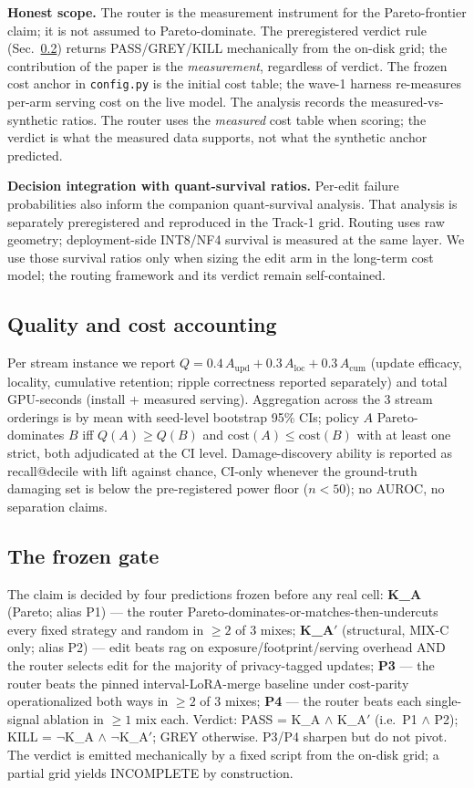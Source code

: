 \documentclass[preprint,12pt]{elsarticle}
\begin{document}
\textbf{Honest scope.} The router is the measurement instrument for the
Pareto-frontier claim; it is not assumed to Pareto-dominate.
The preregistered verdict rule (Sec.~\ref{sec:gate}) returns PASS/GREY/KILL
mechanically from the on-disk grid; the contribution of the paper is the
\emph{measurement}, regardless of verdict. The frozen cost anchor in
\texttt{config.py} is the initial cost table; the wave-1 harness re-measures
per-arm serving cost on the live model. The analysis records the
measured-vs-synthetic ratios.
The router uses the \emph{measured} cost table when scoring; the verdict is
what the measured data supports, not what the synthetic anchor predicted.

\textbf{Decision integration with quant-survival ratios.} Per-edit failure
probabilities also inform the companion quant-survival analysis. That analysis is
separately preregistered and reproduced in the Track-1 grid. Routing uses raw
geometry; deployment-side INT8/NF4 survival is measured at the same layer. We use
those survival ratios only when sizing the edit arm in the long-term cost model;
the routing framework and its verdict remain self-contained.

\subsection{Quality and cost accounting}
\label{sec:metrics}
Per stream instance we report $Q = 0.4\,A_{\mathrm{upd}} + 0.3\,A_{\mathrm{loc}} +
0.3\,A_{\mathrm{cum}}$ (update efficacy, locality, cumulative retention; ripple
correctness reported separately) and total GPU-seconds (install + measured serving).
Aggregation across the 3 stream orderings is by mean with seed-level bootstrap 95\%
CIs; policy $A$ Pareto-dominates $B$ iff $Q(A) \ge Q(B)$ and
$\mathrm{cost}(A) \le \mathrm{cost}(B)$ with at least one strict, both adjudicated
at the CI level. Damage-discovery ability is reported as recall@decile with lift
against chance, CI-only whenever the ground-truth damaging set is below the
pre-registered power floor ($n{<}50$); no AUROC, no separation claims.

\subsection{The frozen gate}
\label{sec:gate}
The claim is decided by four predictions frozen before any real cell:
\textbf{K\_A} (Pareto; alias P1) — the router Pareto-dominates-or-matches-then-undercuts every
fixed strategy and random in $\ge 2$ of 3 mixes;
\textbf{K\_A$'$} (structural, MIX-C only; alias P2) — edit beats rag on exposure/footprint/serving
overhead AND the router selects edit for the majority of privacy-tagged updates;
\textbf{P3} — the router beats the pinned interval-LoRA-merge baseline under
cost-parity operationalized both ways in $\ge 2$ of 3 mixes;
\textbf{P4} — the router beats each single-signal ablation in $\ge 1$ mix each.
Verdict: PASS = K\_A $\wedge$ K\_A$'$ (i.e.\ P1 $\wedge$ P2); KILL = $\neg$K\_A $\wedge$ $\neg$K\_A$'$; GREY otherwise.
P3/P4 sharpen but do not pivot. The verdict is emitted mechanically by a fixed
script from the on-disk grid; a partial grid yields INCOMPLETE by construction.
\end{document}
